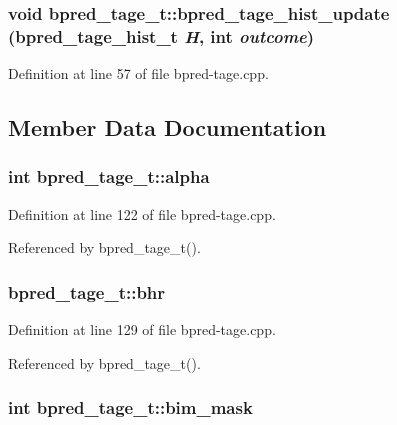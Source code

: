 \subsubsection[{bpred\_\-tage\_\-hist\_\-update}]{\setlength{\rightskip}{0pt plus 5cm}void bpred\_\-tage\_\-t::bpred\_\-tage\_\-hist\_\-update ({\bf bpred\_\-tage\_\-hist\_\-t} {\em H}, \/  int {\em outcome})\hspace{0.3cm}{\tt  [inline, private]}}\label{classbpred__tage__t_32ef3a555cc458d095d51264ff31dd24}




Definition at line 57 of file bpred-tage.cpp.

\subsection{Member Data Documentation}
\subsubsection[{alpha}]{\setlength{\rightskip}{0pt plus 5cm}int {\bf bpred\_\-tage\_\-t::alpha}\hspace{0.3cm}{\tt  [protected]}}\label{classbpred__tage__t_5b68b9986a6098a68b097f715ff589d6}




Definition at line 122 of file bpred-tage.cpp.

Referenced by bpred\_\-tage\_\-t().
\subsubsection[{bhr}]{ {\bf bpred\_\-tage\_\-t::bhr}\hspace{0.3cm}{\tt  [protected]}}\label{classbpred__tage__t_a053e045931174c5a651b60b9651968c}




Definition at line 129 of file bpred-tage.cpp.

Referenced by bpred\_\-tage\_\-t().
\subsubsection[{bim\_\-mask}]{\setlength{\rightskip}{0pt plus 5cm}int {\bf bpred\_\-tage\_\-t::bim\_\-mask}\hspace{0.3cm}{\tt  [protected]}}\label{classbpred__tage__t_8db04ef23ef09a19ab1b2df0bec9fb5a}




